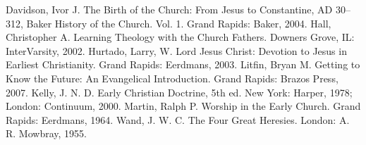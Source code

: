 \begin{readinglist}
\entry Davidson, Ivor J. The Birth of the Church: From Jesus to Constantine, AD 30–312, Baker
  History of the Church. Vol. 1. Grand Rapids: Baker, 2004.
\entry Hall, Christopher A. Learning Theology with the Church Fathers. Downers Grove, IL:
  InterVarsity, 2002.
\entry Hurtado, Larry, W. Lord Jesus Christ: Devotion to Jesus in Earliest Christianity. Grand
  Rapids: Eerdmans, 2003.
\entry *Litfin, Bryan M. Getting to Know the Future: An Evangelical Introduction. Grand Rapids:
  Brazos Press, 2007.
\entry Kelly, J. N. D. Early Christian Doctrine, 5th ed. New York: Harper, 1978; London: Continuum,
  2000.
\entry Martin, Ralph P. Worship in the Early Church. Grand Rapids: Eerdmans, 1964.
\entry Wand, J. W. C. The Four Great Heresies. London: A. R. Mowbray, 1955.
\end{readinglist}
